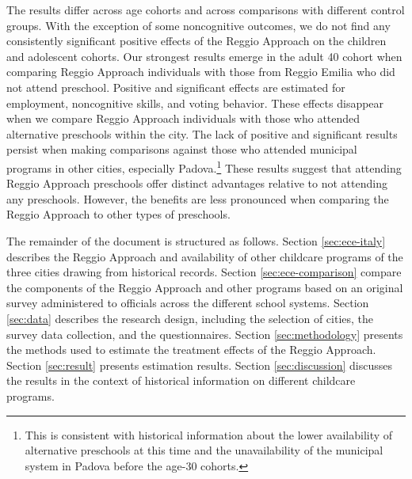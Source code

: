 The results differ across age cohorts and across comparisons with different control groups. With the exception of some noncognitive outcomes, we do not find any consistently significant positive effects of the Reggio Approach on the children and adolescent cohorts. Our strongest results emerge in the adult 40 cohort when comparing Reggio Approach individuals with those from Reggio Emilia who did not attend preschool. Positive and significant effects are estimated for employment, noncognitive skills, and voting behavior. These effects disappear when we compare Reggio Approach individuals with those who attended alternative preschools within the city. The lack of positive and significant results persist when making comparisons against those who attended municipal programs in other cities, especially Padova.\footnote{This is consistent with historical information about the lower availability of alternative preschools at this time and the unavailability of the municipal system in Padova before the age-30 cohorts.} These results suggest that attending Reggio Approach preschools offer distinct advantages relative to not attending any preschools. However, the benefits are less pronounced when comparing the Reggio Approach to other types of preschools. 

The remainder of the document is structured as follows. Section \ref{sec:ece-italy} describes the Reggio Approach and availability of other childcare programs of the three cities drawing from historical records. Section \ref{sec:ece-comparison} compare the components of the Reggio Approach and other programs based on an original survey administered to officials across the different school systems. Section \ref{sec:data} describes the research design, including the selection of cities, the survey data collection, and the questionnaires. Section \ref{sec:methodology} presents the methods used to estimate the treatment effects of the Reggio Approach. Section \ref{sec:result} presents estimation results. Section \ref{sec:discussion} discusses the results in the context of historical information on different childcare programs. 

